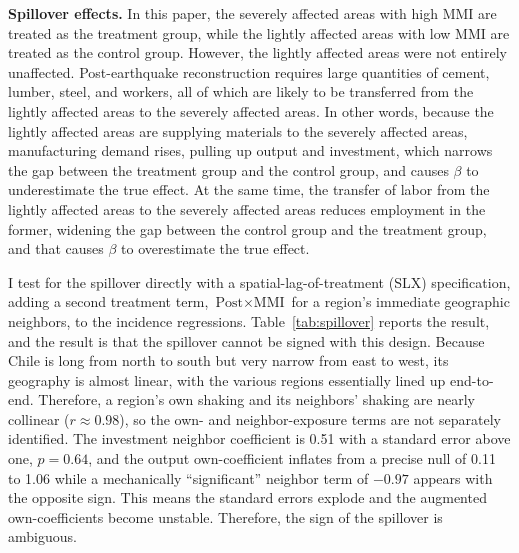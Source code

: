 \documentclass[12pt]{article}
\begin{document}
\textbf{Spillover effects.} In this paper, the severely affected areas with high MMI are treated as the
treatment group, while the lightly affected areas with low MMI are treated as the control group. However,
the lightly affected areas were not entirely unaffected. Post-earthquake reconstruction requires large
quantities of cement, lumber, steel, and workers, all of which are likely to be transferred from the
lightly affected areas to the severely affected areas. In other words, because the lightly affected areas
are supplying materials to the severely affected areas, manufacturing demand rises, pulling up output and
investment, which narrows the gap between the treatment group and the control group, and causes $\beta$ to
underestimate the true effect. At the same time, the transfer of labor from the lightly affected areas to
the severely affected areas reduces employment in the former, widening the gap between the control group
and the treatment group, and that causes $\beta$ to overestimate the true effect.

I test for the spillover directly with a spatial-lag-of-treatment (SLX) specification, adding a second
treatment term, $\text{Post} \times \text{MMI}$ for a region's immediate geographic neighbors, to the
incidence regressions. Table~\ref{tab:spillover} reports the result, and the result is that the spillover
cannot be signed with this design. Because Chile is long from north to south but very narrow from east to
west, its geography is almost linear, with the various regions essentially lined up end-to-end.
Therefore, a region's own shaking and its neighbors' shaking are nearly collinear ($r \approx 0.98$), so
the own- and neighbor-exposure terms are not separately identified. The investment neighbor coefficient is
0.51 with a standard error above one, $p = 0.64$, and the output own-coefficient inflates from a precise
null of 0.11 to 1.06 while a mechanically ``significant'' neighbor term of $-0.97$ appears with the
opposite sign. This means the standard errors explode and the augmented own-coefficients become unstable.
Therefore, the sign of the spillover is ambiguous.


\end{document}
